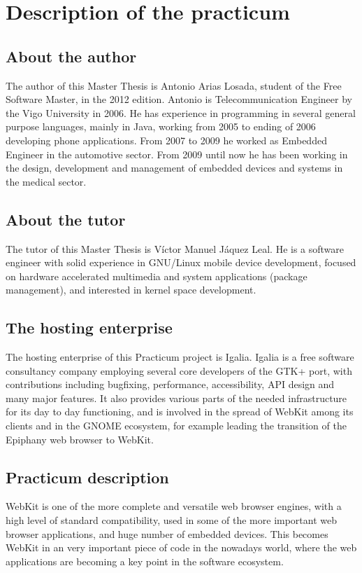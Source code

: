 \documentclass[a4paper,11pt,openany]{report}
\begin{document}
\chapter{Description of the practicum}

\section{About the author}
The author of this Master Thesis is Antonio Arias Losada, student of the Free Software Master, in the 2012 edition.
Antonio is Telecommunication Engineer by the Vigo University in 2006. He has experience in programming in several general purpose languages, mainly in Java, working from 2005 to ending of 2006 developing phone applications. From 2007 to 2009 he worked as Embedded Engineer in the automotive sector. From 2009 until now he has been working in the design, development and management of embedded devices and systems in the medical sector.

\section{About the tutor}
The tutor of this Master Thesis is V\'ictor Manuel J\'aquez Leal. He is a software engineer with solid experience in GNU/Linux mobile device development, focused on hardware accelerated multimedia and system applications (package management), and interested in kernel space development.

\section{The hosting enterprise}
The hosting enterprise of this Practicum project is Igalia\cite{igalia}. Igalia is a free software consultancy company employing several core developers of the GTK+ port, with contributions including bugfixing, performance, accessibility, API design and many major features. It also provides various parts of the needed infrastructure for its day to day functioning, and is involved in the spread of WebKit among its clients and in the GNOME ecosystem, for example leading the transition of the Epiphany web browser to WebKit. 

\section{Practicum description}
WebKit is one of the more complete and versatile web browser engines, with a high level of standard compatibility, used in some of the more important web browser applications, and huge number of embedded devices. This becomes WebKit in an very important piece of code in the nowadays world, where the web applications are becoming a key point in the software ecosystem.
\end{document}
